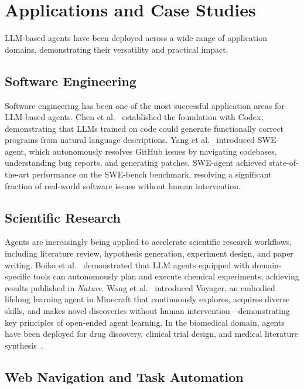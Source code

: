 \documentclass[11pt,a4paper]{article}
\begin{document}
\section{Applications and Case Studies}
\label{sec:applications}

LLM-based agents have been deployed across a wide range of application domains, demonstrating their versatility and practical impact.

\subsection{Software Engineering}

Software engineering has been one of the most successful application areas for LLM-based agents. Chen et al.~\citep{chen2021evaluating} established the foundation with Codex, demonstrating that LLMs trained on code could generate functionally correct programs from natural language descriptions. Yang et al.~\citep{yang2024swe} introduced SWE-agent, which autonomously resolves GitHub issues by navigating codebases, understanding bug reports, and generating patches. SWE-agent achieved state-of-the-art performance on the SWE-bench benchmark, resolving a significant fraction of real-world software issues without human intervention.

\subsection{Scientific Research}

Agents are increasingly being applied to accelerate scientific research workflows, including literature review, hypothesis generation, experiment design, and paper writing. Boiko et al.~\citep{boiko2023autonomous} demonstrated that LLM agents equipped with domain-specific tools can autonomously plan and execute chemical experiments, achieving results published in \emph{Nature}. Wang et al.~\citep{wang2023voyager} introduced Voyager, an embodied lifelong learning agent in Minecraft that continuously explores, acquires diverse skills, and makes novel discoveries without human intervention---demonstrating key principles of open-ended agent learning. In the biomedical domain, agents have been deployed for drug discovery, clinical trial design, and medical literature synthesis~\citep{huang2024benchmarking}.

\subsection{Web Navigation and Task Automation}
\end{document}
